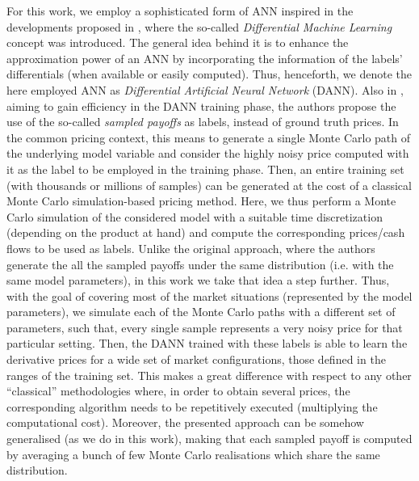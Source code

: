     For this work, we employ a sophisticated form of ANN inspired in the developments proposed in \cite{huge2020}, where the so-called \emph{Differential Machine Learning} concept was introduced. The general idea behind it is to enhance the approximation power of an ANN by incorporating the information of the labels' differentials (when available or easily computed). Thus, henceforth, we denote the here employed ANN as \emph{Differential Artificial Neural Network} (DANN). Also in \cite{huge2020}, aiming to gain efficiency in the DANN training phase, the authors propose the use of the so-called \emph{sampled payoffs} as labels, instead of ground truth prices. In the common pricing context, this means to generate a single Monte Carlo path of the underlying model variable and consider the highly noisy price computed with it as the label to be employed in the training phase. Then, an entire training set (with thousands or millions of samples) can be generated at the cost of a classical Monte Carlo simulation-based pricing method. Here, we thus perform a Monte Carlo simulation of the considered model with a suitable time discretization (depending on the product at hand) and compute the corresponding prices/cash flows to be used as labels. Unlike the original approach, where the authors generate the all the sampled payoffs under the same distribution (i.e. with the same model parameters), in this work we take that idea a step further. Thus, with the goal of covering most of the market situations (represented by the model parameters), we simulate each of the Monte Carlo paths with a different set of parameters, such that, every single sample represents a very noisy price for that particular setting. Then, the DANN trained with these labels is able to learn the derivative prices for a wide set of market configurations, those defined in the ranges of the training set. This makes a great difference with respect to any other ``classical'' methodologies where, in order to obtain several prices, the corresponding algorithm needs to be repetitively executed (multiplying the computational cost). Moreover, the presented approach can be somehow generalised (as we do in this work), making that each sampled payoff is computed by averaging a bunch of few Monte Carlo realisations which share the same distribution.

